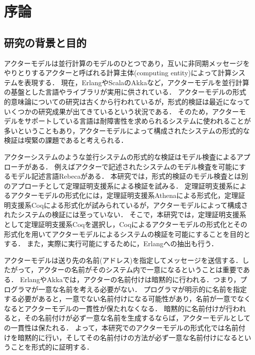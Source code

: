 \chapter{序論}
\label{chapter:intro}

\section{研究の背景と目的}
アクターモデル\cite{Agha:1986aa}は並行計算のモデルのひとつであり，互いに非同期メッセージをやりとりするアクターと呼ばれる計算主体(computing entity)によって計算システムを表現する．
現在，Erlang\cite{Erlang}やScala\cite{Scala}のAkka\cite{Akka}など，アクターモデルを並行計算の基盤とした言語やライブラリが実用に供されている．
アクターモデルの形式的意味論についての研究は古くから行われているが，形式的検証は最近になっていくつかの研究成果が出てきているという状況である．
そのため，アクターモデルをサポートしている言語は耐障害性を求められるシステムに使われることが多いということもあり，アクターモデルによって構成されたシステムの形式的な検証は喫緊の課題であると考えられる．

アクターシステムのような並行システムの形式的な検証はモデル検査によるアプローチがある．
例えばアクターで記述されたシステムのモデル検査を可能にするモデル記述言語Rebeca\cite{Sirjani:2011aa}がある．
本研究では，形式的検証のモデル検査とは別のアプローチとして定理証明支援系による検証を試みる．
定理証明支援系によるアクターモデルの形式化には，定理証明支援系Athenaによる形式化\cite{Musser:2013aa}，定理証明支援系Coqによる形式化\cite{Garnock-Jones:2014aa}が試みられているが，アクターモデルによって構成されたシステムの検証には至っていない．
そこで，本研究では，定理証明支援系として定理証明支援系Coqを選択し，Coqによるアクターモデルの形式化とその形式化を用いてアクターモデルによるシステムの検証を可能にすることを目的とする．
また，実際に実行可能にするために，Erlangへの抽出も行う．

アクターモデルは送り先の名前(アドレス)を指定してメッセージを送信する．したがって，アクターの名前がそのシステム内で一意になるということは重要である．
ErlangやAkkaでは，アクターの名前付けは暗黙的に行われる．つまり，プログラマが一意な名前を考える必要がない．
プログラマが明示的に名前を指定する必要があると，一意でない名前付けになる可能性があり，名前が一意でなくなるとアクターモデルの一貫性が保たれなくなる．
暗黙的に名前付けが行われると，その名前付けが必ず一意な名前を生成するならば，アクターモデルとしての一貫性は保たれる．
よって，本研究でのアクターモデルの形式化では名前付けを暗黙的に行い，そしてその名前付けの方法が必ず一意な名前付けになるということを形式的に証明する．


